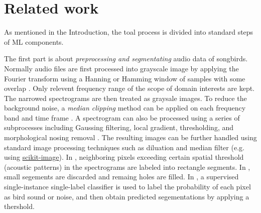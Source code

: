 \documentclass[12pt,peerreview,letterpaper]{IEEEtran}
\begin{document}

\section{Related work}

As mentioned in the Introduction, the toal process is divided into standard steps of ML components.

The first part is about {\em preprocessing and segmentating} audio data of songbirds. Normally audio files are first processed into grayscale image by applying the Fourier transform using a Hanning or Hamming window of samples with some overlap \cite{Lasseck13, mlsp1}. Only relevent frequency range of the scope of domain interests are kept. The narrowed spectrograms are then treated as graysale images. To reduce the background noise, a {\em median clipping} method can be applied on each frequency band and time frame
\cite{mlsp1}. A spectrogram can also be processed using a series of subprocesses including Gaussing filtering, local gradient, thresholding, and morphological nosing removal \cite{fodor2013ninth}. The resulting images can be further handled using standard image processing techniques such as diluation and median filter (e.g. using \href{http://scikit-image.org/}{scikit-image}). In \cite{Lasseck13}, neighboring pixels exceeding certain spatial threshold (acoustic patterns) in the spectrograms are labeled into rectangle segments. In \cite{fodor2013ninth}, small segements are discarded and remaing holes are filled. In \cite{mlsp1}, a supervised single-instance single-label classifier is used to label the probability of each pixel as bird sound or noise, and then obtain predicted segementations by applying a thershold.
\end{document}

